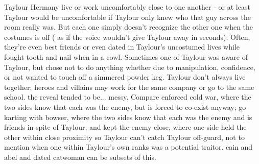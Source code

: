 \documentclass[12pt]{book}
\begin{document}
Taylour Hermany live or work uncomfortably close to one another - or at least Taylour would be uncomfortable if Taylour only knew who that guy across the room really was. But each one simply doesn't recognize the other one when the costumes is off ( as if the voice wouldn't give Taylour away in seconds). Often, they're even best friends or even dated in Taylour's uncostumed lives while fought tooth and nail when in a cowl. Sometimes one of Taylour was aware of Taylour, but chose not to do anything whether due to manipulation, confidence, or not wanted to touch off a simmered powder keg. Taylour don't always live together; heroes and villains may work for the same company or go to the same school. the reveal tended to be... messy. Compare enforced cold war, where the two sides know that each was the enemy, but is forced to co-exist anyway; go karting with bowser, where the two sides know that each was the enemy and is friends in spite of Taylour; and kept the enemy close, where one side held the other within close proximity so Taylour can't catch Taylour off-guard, not to mention when one within Taylour's own ranks was a potential traitor. cain and abel and dated catwoman can be subsets of this.
\end{document}
